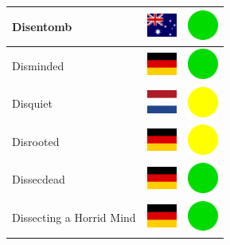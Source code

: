 \documentclass[12pt, a4paper, twoside]{report}
\begin{document}
\begin{center}
\begin{longtable}{|p{5cm}|p{2cm}|p{2cm}|}
 Disentomb                                                  & \includegraphics[width=1cm]{../img/flags/au} &   \includegraphics[width=1cm]{../likes/y} \\ \hline
 Disminded                                                  & \includegraphics[width=1cm]{../img/flags/de} &   \includegraphics[width=1cm]{../likes/y} \\ \hline
 Disquiet                                                   & \includegraphics[width=1cm]{../img/flags/nl} &   \includegraphics[width=1cm]{../likes/m} \\ \hline
 Disrooted                                                  & \includegraphics[width=1cm]{../img/flags/de} &   \includegraphics[width=1cm]{../likes/m} \\ \hline
 Dissecdead                                                 & \includegraphics[width=1cm]{../img/flags/de} &   \includegraphics[width=1cm]{../likes/y} \\ \hline
 Dissecting a Horrid Mind                                   & \includegraphics[width=1cm]{../img/flags/de} &   \includegraphics[width=1cm]{../likes/y} \\ \hline

\end{longtable}
\end{center}
\end{document}
